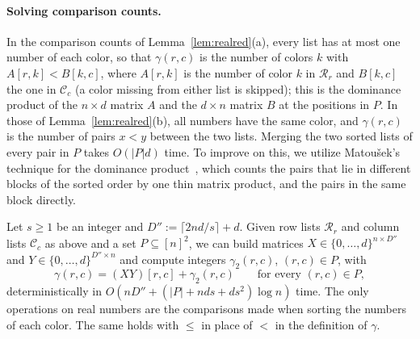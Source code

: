 \paragraph{Solving comparison counts.}
In the comparison counts of Lemma~\ref{lem:realred}(a), every list has at most one number of each color, so that $\gamma(r,c)$ is the number of colors $k$ with $A[r,k]<B[k,c]$, where $A[r,k]$ is the number of color $k$ in $\mathcal R_r$ and $B[k,c]$ the one in $\mathcal C_c$ (a color missing from either list is skipped); this is the dominance product of the $n\times d$ matrix $A$ and the $d\times n$ matrix $B$ at the positions in $P$. In those of Lemma~\ref{lem:realred}(b), all numbers have the same color, and $\gamma(r,c)$ is the number of pairs $x<y$ between the two lists. Merging the two sorted lists of every pair in $P$ takes $O(|P|d)$ time. 
To improve on this, we utilize Matou\v sek's technique for the dominance product~\cite{Mat91}, which counts the pairs that lie in different blocks of the sorted order by one thin matrix product, and the pairs in the same block directly.

\begin{lemma}\label{lem:cmp}
Let $s\ge1$ be an integer and $D'':=\lceil2nd/s\rceil+d$. Given row lists $\mathcal R_r$ and column lists $\mathcal C_c$ as above and a set $P\subseteq[n]^2$, we can build matrices $X\in\{0,\dots,d\}^{n\times D''}$ and $Y\in\{0,\dots,d\}^{D''\times n}$ and compute integers $\gamma_2(r,c)$, $(r,c)\in P$, with
\[
\gamma(r,c)=(XY)[r,c]+\gamma_2(r,c)\qquad\text{for every }(r,c)\in P,
\]
deterministically in $O(nD''+(|P|+nds+ds^2)\log n)$ time. The only operations on real numbers are the comparisons made when sorting the numbers of each color. The same holds with $\le$ in place of $<$ in the definition of $\gamma$.
\end{lemma}

